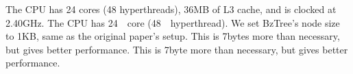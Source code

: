 The CPU has 24 cores (48 hyperthreads), 36MB of L3 cache, and is clocked at 2.40GHz. %
The CPU has 24　core (48　hyperthread).%
We set BzTree’s node size to 1KB, same as the original paper’s setup. 
This is 7bytes more than necessary, but gives better performance. 
This is 7byte more than necessary, but gives better performance. 